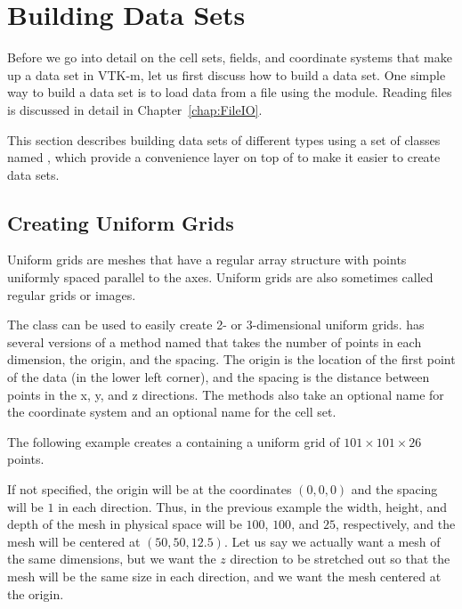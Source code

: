 \section{Building Data Sets}
\label{sec:DataSets:Building}


Before we go into detail on the cell sets, fields, and coordinate systems
that make up a data set in VTK-m, let us first discuss how to build a data
set. One simple way to build a data set is to load data from a file using
the \vtkmio{} module. Reading files is discussed in detail in
Chapter~\ref{chap:FileIO}.

This section describes building data sets of different types using a set of
classes named , which provide a convenience layer
on top of  to make it easier to create data sets.

\subsection{Creating Uniform Grids}


Uniform grids are meshes that have a regular array structure with points
uniformly spaced parallel to the axes. Uniform grids are also sometimes
called regular grids or images.

The  class can be used to easily create 2-
or 3-dimensional uniform grids.  has
several versions of a method named  that takes the number
of points in each dimension, the origin, and the spacing. The origin is the
location of the first point of the data (in the lower left corner), and the
spacing is the distance between points in the x, y, and z directions. The
 methods also take an optional name for the coordinate
system and an optional name for the cell set.

The following example creates a  containing a uniform
grid of $101 \times 101 \times 26$ points.


If not specified, the origin will be at the coordinates $(0,0,0)$ and the
spacing will be $1$ in each direction. Thus, in the previous example the
width, height, and depth of the mesh in physical space will be $100$,
$100$, and $25$, respectively, and the mesh will be centered at $(50, 50,
12.5)$. Let us say we actually want a mesh of the same dimensions, but we
want the $z$ direction to be stretched out so that the mesh will be the
same size in each direction, and we want the mesh centered at the origin.

